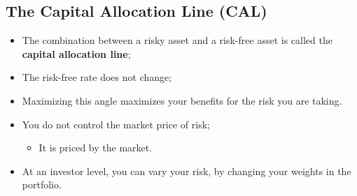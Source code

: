 \documentclass[11pt,a4paper]{report}
\begin{document}
\subsection{The Capital Allocation Line (CAL)}
\begin{itemize}
    \item The combination between a risky asset and a risk-free asset is called the \textbf{capital allocation line};
    \item The risk-free rate does not change;
    \item Maximizing this angle maximizes your benefits for the risk you are taking.
    \item You do not control the market price of risk;
    \begin{itemize}
        \item It is priced by the market.
    \end{itemize}
    \item At an investor level, you can vary your risk, by changing your weights in the portfolio.
\end{itemize}
\end{document}
